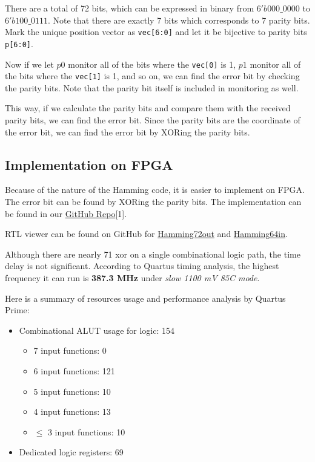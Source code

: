 \documentclass[conference]{IEEEtran}
\begin{document}
There are a total of 72 bits, which can be expressed in binary from
$6'b000\_0000$ to $6'b 100\_0111$. Note that there are exactly 7 bits which
corresponds to 7 parity bits. Mark the unique position vector as
\texttt{vec[6:0]} and let it be bijective to parity bits \texttt{p[6:0]}.

Now if we let $p0$ monitor all of the bits where the \texttt{vec[0]} is 1, $p1$
monitor all of the bits where the \texttt{vec[1]} is 1, and so on, we can find
the error bit by checking the parity bits. Note that the parity bit itself is
included in monitoring as well.

This way, if we calculate the parity bits and compare them with the received
parity bits, we can find the error bit. Since the parity bits are the
coordinate of the error bit, we can find the error bit by XORing the parity
bits.
\subsection{Implementation on FPGA}
Because of the nature of the Hamming code, it is easier to implement on FPGA.
The error bit can be found by XORing the parity bits. The implementation can be
found in our \href{https://github.com/luckunately/ELEC433-Projects}{GitHub
  Repo}[1]. %

  RTL viewer can be found on GitHub for \href{https://github.com/luckunately/ELEC433-Projects/blob/add-tex/Hamming72out/Hamming72out_RTL.pdf}{Hamming72out} and \href{https://github.com/luckunately/ELEC433-Projects/blob/add-tex/Hamming64in/Hamming64inRTL.pdf}{Hamming64in}.

Although there are nearly 71 xor on a single combinational logic path, the time
delay is not significant. According to Quartus timing analysis, the highest
frequency it can run is \textbf{387.3 MHz} under \textit{slow 1100 mV 85C
  mode}.

Here is a summary of resources usage and performance analysis by Quartus Prime:
\begin{itemize}
  \item Combinational ALUT usage for logic: 154
  \begin{itemize}
    \item 7 input functions: 0
    \item 6 input functions: 121
    \item 5 input functions: 10
    \item 4 input functions: 13
    \item $\leq$ 3 input functions: 10
  \end{itemize}
  \item Dedicated logic registers: 69
\end{itemize}
\end{document}
